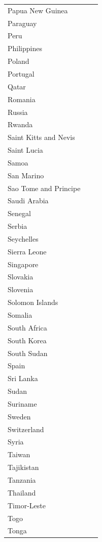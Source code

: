 \documentclass{clgrammar}
\begin{document}
\begin{longtable}{lll}
	Papua New Guinea &  &  \\
	Paraguay &  &  \\
	Peru &  &  \\
	Philippines &  &  \\
	Poland &  &  \\
	Portugal &  &  \\
	Qatar &  &  \\
	Romania &  &  \\
	Russia &  &  \\
	Rwanda &  &  \\
	Saint Kitts and Nevis &  &  \\
	Saint Lucia &  &  \\
	Samoa &  &  \\
	San Marino &  &  \\
	Sao Tome and Principe &  &  \\
	Saudi Arabia &  &  \\
	Senegal &  &  \\
	Serbia &  &  \\
	Seychelles &  &  \\
	Sierra Leone &  &  \\
	Singapore &  &  \\
	Slovakia &  &  \\
	Slovenia &  &  \\
	Solomon Islands &  &  \\
	Somalia &  &  \\
	South Africa &  &  \\
	South Korea &  &  \\
	South Sudan &  &  \\
	Spain &  &  \\
	Sri Lanka &  &  \\
	Sudan &  &  \\
	Suriname &  &  \\
	Sweden &  &  \\
	Switzerland &  &  \\
	Syria &  &  \\
	Taiwan &  &  \\
	Tajikistan &  &  \\
	Tanzania &  &  \\
	Thailand &  &  \\
	Timor-Leste &  &  \\
	Togo &  &  \\
	Tonga &  &  \\

\end{longtable}
\end{document}
